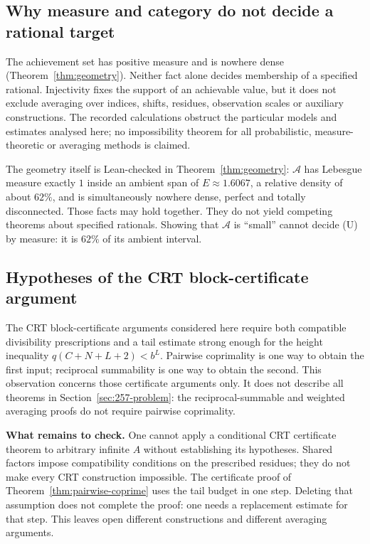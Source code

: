 \subsection{Why measure and category do not decide a rational target}
\label{bar:measure}

\begin{rem}
\label{prop:soft}
The achievement set has positive measure and is nowhere dense
(Theorem~\ref{thm:geometry}). Neither fact alone decides membership of a specified rational.
Injectivity fixes the support of an achievable value, but it does not exclude averaging over
indices, shifts, residues, observation scales or auxiliary constructions. The recorded
calculations obstruct the particular models and estimates analysed here; no impossibility theorem
for all probabilistic, measure-theoretic or averaging methods is claimed.
\end{rem}

The geometry itself is Lean-checked in Theorem~\ref{thm:geometry}: $\mathcal{A}$ has Lebesgue
measure exactly $1$ inside an ambient span of $E \approx 1.6067$, a relative density of about
$62\%$, and is simultaneously nowhere dense, perfect and totally disconnected. Those facts may hold
together. They do not yield competing theorems about specified rationals. Showing that
$\mathcal{A}$ is ``small'' cannot decide (U) by measure: it is $62\%$ of its ambient interval.

\subsection{Hypotheses of the CRT block-certificate argument}
\label{bar:box}

\begin{obs}
\label{obs:box}
The CRT block-certificate arguments considered here require both
compatible divisibility prescriptions and a tail estimate strong enough
for the height inequality $q(C+N+L+2)<b^L$.  Pairwise coprimality is one
way to obtain the first input; reciprocal summability is one way to obtain
the second.  This observation concerns those certificate arguments only.
It does not describe all theorems in Section~\ref{sec:257-problem}:
the reciprocal-summable and weighted averaging proofs do not require
pairwise coprimality.
\end{obs}

\textbf{What remains to check.} One cannot apply a conditional CRT
certificate theorem to arbitrary infinite $A$ without establishing its
hypotheses.  Shared factors impose compatibility conditions on the
prescribed residues; they do not make every CRT construction impossible.
The certificate proof of Theorem~\ref{thm:pairwise-coprime} uses the tail
budget in one step.  Deleting that assumption
does not complete the proof: one needs a replacement estimate for that step.
This leaves open different constructions and different averaging arguments.

